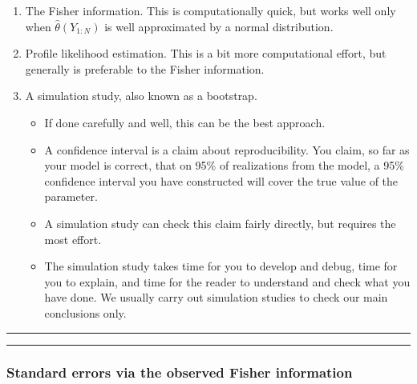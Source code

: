 \documentclass[]{article}
\begin{document}
\begin{enumerate}
\def\labelenumi{\arabic{enumi}.}
\item
  The Fisher information. This is computationally quick, but works well
  only when \(\hat\theta(Y_{1:N})\) is well approximated by a normal
  distribution.
\item
  Profile likelihood estimation. This is a bit more computational
  effort, but generally is preferable to the Fisher information.
\item
  A simulation study, also known as a bootstrap.

  \begin{itemize}
  \item
    If done carefully and well, this can be the best approach.
  \item
    A confidence interval is a claim about reproducibility. You claim,
    so far as your model is correct, that on 95\% of realizations from
    the model, a 95\% confidence interval you have constructed will
    cover the true value of the parameter.
  \item
    A simulation study can check this claim fairly directly, but
    requires the most effort.
  \item
    The simulation study takes time for you to develop and debug, time
    for you to explain, and time for the reader to understand and check
    what you have done. We usually carry out simulation studies to check
    our main conclusions only.
  \end{itemize}
\end{enumerate}

\begin{center}\rule{0.5\linewidth}{\linethickness}\end{center}

\begin{center}\rule{0.5\linewidth}{\linethickness}\end{center}

\subsubsection{Standard errors via the observed Fisher
information}\label{standard-errors-via-the-observed-fisher-information}
\end{document}
